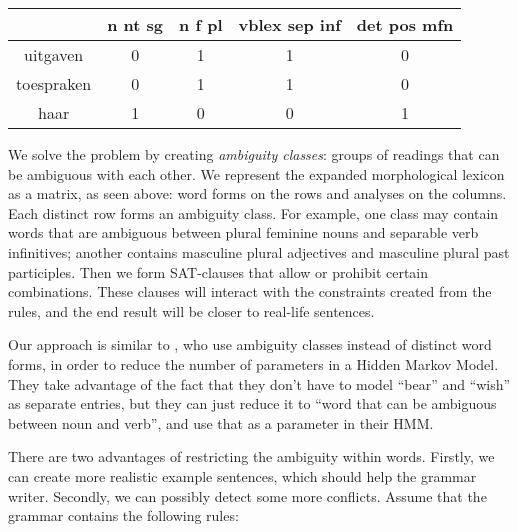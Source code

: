 {{\begin{center}
\begin{tabular}{c|c|c|c|c}


            & n nt sg  & n f pl  & vblex sep inf & det pos mfn  \\ \hline
uitgaven    & 0        & 1       & 1             & 0    \\ 
toespraken  & 0        & 1       & 1             & 0    \\ 
haar        & 1        & 0       & 0             & 1    \\ 


\end{tabular}
\end{center}

We solve the problem by creating \emph{ambiguity classes}: groups of readings that can be ambiguous with each other. 
We represent the expanded morphological lexicon as a matrix, as seen
above: word forms on the rows and analyses on the columns. Each
distinct row forms an ambiguity class. For example, one class may
contain words that are ambiguous between plural feminine nouns and
separable verb infinitives; another contains masculine plural adjectives 
and masculine plural past participles.
Then we form SAT-clauses that allow or prohibit certain combinations. These clauses will interact with the constraints created from the rules, and the end result will be closer to real-life sentences.

Our approach is similar to , who use ambiguity classes instead of distinct word forms, in order to reduce the number of parameters in a Hidden Markov Model. They take advantage of the fact that they don't have to model ``bear'' and ``wish'' as separate entries, but they can just reduce it to ``word that can be ambiguous between noun and verb'', and use that as a parameter in their HMM. 

There are two advantages of restricting the ambiguity within words.
Firstly, we can create more realistic example sentences, which should help the grammar writer.
Secondly, we can possibly detect some more conflicts. Assume that the grammar contains the following rules:

}}
